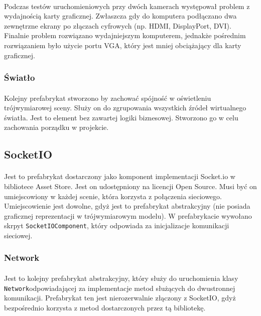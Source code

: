 \paragraph{}
Podczas testów uruchomieniowych przy dwóch kamerach występował problem z wydajnością karty graficznej. Zwłaszcza gdy do komputera podłączano dwa zewnętrzne ekrany po złączach cyfrowych (np. HDMI, DisplayPort, DVI). Finalnie problem rozwiązano wydajniejszym komputerem, jednakże pośrednim rozwiązaniem było użycie portu VGA, który jest mniej obciążający dla karty graficznej.

\subsubsection{Światło}
\paragraph{}
Kolejny prefabrykat stworzono by zachować spójność w oświetleniu trójwymiarowej sceny. Służy on do zgrupowania wszystkich źródeł wirtualnego światła. Jest to element bez zawartej logiki biznesowej. Stworzono go w celu zachowania porządku w projekcie.


\subsection{SocketIO}
\paragraph{}
Jest to prefabrykat dostarczony jako komponent implementacji Socket.io w bibliotece Asset Store. Jest on udostępniony na licencji Open Source.  Musi być on umiejscowiony w każdej scenie, która korzysta z połączenia sieciowego. Umiejscowienie jest dowolne, gdyż jest to prefabrykat abstrakcyjny (nie posiada graficznej reprezentacji w trójwymiarowym modelu). W prefabrykacie wywołano skrpyt \texttt{SocketIOComponent}, który odpowiada za inicjalizacje komunikacji sieciowej.

\subsubsection{Network}
\paragraph{}
Jest to kolejny prefabrykat abstrakcyjny, który służy do uruchomienia klasy \texttt{Network}odpowiadającej za implementacje metod służących do dwustronnej komunikacji.
Prefabrykat ten jest nierozerwalnie złączony z SocketIO, gdyż bezpośrednio korzysta z metod dostarczonych przez tą bibliotekę.


